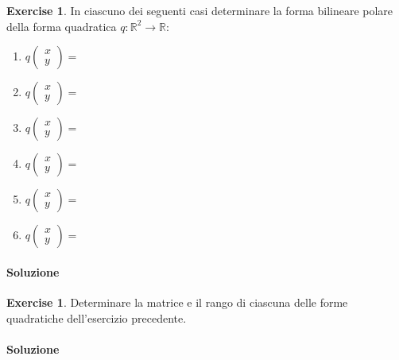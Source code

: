 \documentclass{article}
\theoremstyle{plain}
\theoremstyle{definition}
\newtheorem{xca}[exmp]{Exercise}
\theoremstyle{remark}
\begin{document}
\begin{bxthm}
\begin{xca}
    In ciascuno dei seguenti casi determinare la forma bilineare polare della forma quadratica $q:\mathbb{R}^2\to\mathbb{R}$:
    \begin{enumerate}
        \item $q\begin{pmatrix}x\\y\end{pmatrix}=$
        \item $q\begin{pmatrix}x\\y\end{pmatrix}=$
        \item $q\begin{pmatrix}x\\y\end{pmatrix}=$
        \item $q\begin{pmatrix}x\\y\end{pmatrix}=$
        \item $q\begin{pmatrix}x\\y\end{pmatrix}=$
        \item $q\begin{pmatrix}x\\y\end{pmatrix}=$
    \end{enumerate}
\end{xca}
\end{bxthm}
\paragraph{Soluzione}

\vspace{10pt}

\begin{bxthm}
\begin{xca}
    Determinare la matrice e il rango di ciascuna delle forme quadratiche dell'esercizio precedente.
\end{xca}
\end{bxthm}
\paragraph{Soluzione}

\vspace{10pt}
\end{document}
